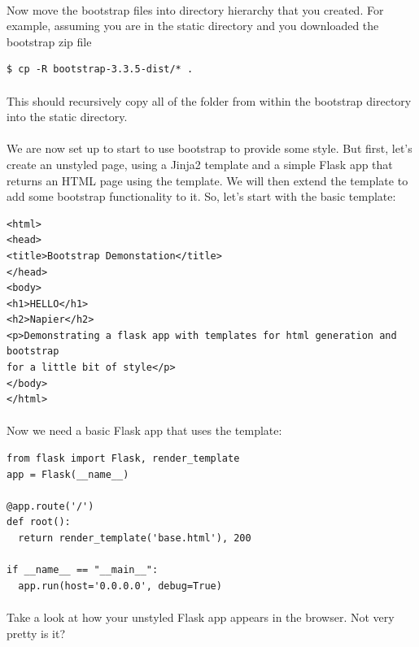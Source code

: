 \documentclass[12pt, a4paper, twoside]{book}
\begin{document}
\paragraph{} Now move the bootstrap files into directory hierarchy that you created. For example, assuming you are in the static directory and you downloaded the bootstrap zip file

\begin{lstlisting}[style=DOS]
    $ cp -R bootstrap-3.3.5-dist/* .
\end{lstlisting}

\paragraph{} This should recursively copy all of the folder from within the bootstrap directory into the static directory.

\paragraph{} We are now set up to start to use bootstrap to provide some style. But first, let's create an unstyled page, using a Jinja2 template and a simple Flask app that returns an HTML page using the template. We will then extend the template to add some bootstrap functionality to it. So, let's start with the basic template:

\begin{lstlisting}
<html>
<head>
<title>Bootstrap Demonstation</title>
</head>
<body>
<h1>HELLO</h1>
<h2>Napier</h2>
<p>Demonstrating a flask app with templates for html generation and bootstrap
for a little bit of style</p>
</body>
</html>
\end{lstlisting}

\paragraph{} Now we need a basic Flask app that uses the template:

\begin{lstlisting}
from flask import Flask, render_template
app = Flask(__name__)

@app.route('/')
def root():
  return render_template('base.html'), 200

if __name__ == "__main__":
  app.run(host='0.0.0.0', debug=True)
\end{lstlisting}

\paragraph{} Take a look at how your unstyled Flask app appears in the browser. Not very pretty is it?  
\end{document}
